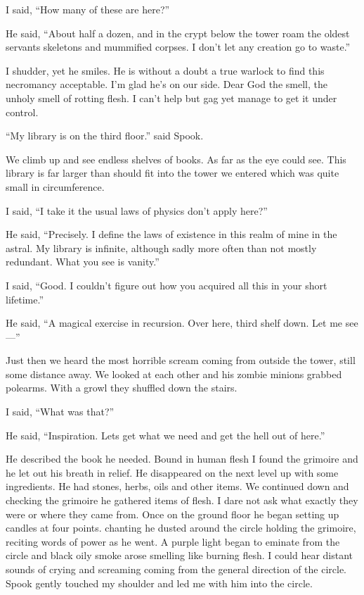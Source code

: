 I said, ``How many of these are here?''

He said, ``About half a dozen, and in the crypt below the tower roam the oldest servants skeletons and mummified corpses. I don't let any creation go to waste.''

I shudder, yet he smiles. He is without a doubt a true warlock to find this necromancy acceptable. I'm glad he's on our side. Dear God the smell, the unholy smell of rotting flesh. I can't help but gag yet manage to get it under control.

``My library is on the third floor.'' said Spook.

We climb up and see endless shelves of books. As far as the eye could see. This library is far larger than should fit into the tower we entered which was quite small in circumference.

I said, ``I take it the usual laws of physics don't apply here?''

He said, ``Precisely. I define the laws of existence in this realm of mine in the astral. My library is infinite, although sadly more often than not mostly redundant. What you see is vanity.''

I said, ``Good. I couldn't figure out how you acquired all this in your short lifetime.''

He said, ``A magical exercise in recursion. Over here, third shelf down. Let me see---''

Just then we heard the most horrible scream coming from outside the tower, still some distance away. We looked at each other and his zombie minions grabbed polearms. With a growl they shuffled down the stairs.

I said, ``What was that?''

He said, ``Inspiration. Lets get what we need and get the hell out of here.''

He described the book he needed. Bound in human flesh I found the grimoire and he let out his breath in relief. He disappeared on the next level up with some ingredients. He had stones, herbs, oils and other items. We continued down and checking the grimoire he gathered items of flesh. I dare not ask what exactly they were or where they came from. Once on the ground floor he began setting up candles at four points. chanting he dusted around the circle holding the grimoire, reciting words of power as he went. A purple light began to eminate from the circle and black oily smoke arose smelling like burning flesh. I could hear distant sounds of crying and screaming coming from the general direction of the circle. Spook gently touched my shoulder and led me with him into the circle.

